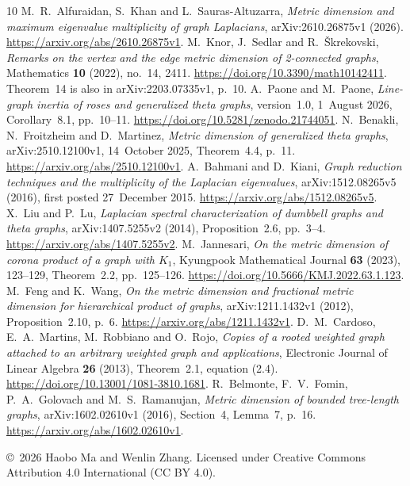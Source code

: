 \documentclass[11pt]{article}
\begin{document}
\begin{thebibliography}{10}
 M.~R.~Alfuraidan, S.~Khan and L.~Sauras-Altuzarra,
\emph{Metric dimension and maximum eigenvalue multiplicity of graph
Laplacians}, arXiv:2610.26875v1 (2026).
\url{https://arxiv.org/abs/2610.26875v1}.
 M.~Knor, J.~Sedlar and R.~\v{S}krekovski,
\emph{Remarks on the vertex and the edge metric dimension of 2-connected
graphs}, Mathematics \textbf{10} (2022), no.~14, 2411.
\url{https://doi.org/10.3390/math10142411}.
Theorem~14 is also in arXiv:2203.07335v1, p.~10.
 A.~Paone and M.~Paone,
\emph{Line-graph inertia of roses and generalized theta graphs},
version~1.0, 1~August 2026, Corollary~8.1, pp.~10--11.
\url{https://doi.org/10.5281/zenodo.21744051}.
 N.~Benakli, N.~Froitzheim and D.~Martinez,
\emph{Metric dimension of generalized theta graphs},
arXiv:2510.12100v1, 14~October 2025, Theorem~4.4, p.~11.
\url{https://arxiv.org/abs/2510.12100v1}.
 A.~Bahmani and D.~Kiani,
\emph{Graph reduction techniques and the multiplicity of the Laplacian
eigenvalues}, arXiv:1512.08265v5 (2016), first posted 27~December 2015.
\url{https://arxiv.org/abs/1512.08265v5}.
 X.~Liu and P.~Lu, \emph{Laplacian spectral characterization
of dumbbell graphs and theta graphs}, arXiv:1407.5255v2 (2014),
Proposition~2.6, pp.~3--4.
\url{https://arxiv.org/abs/1407.5255v2}.
 M.~Jannesari, \emph{On the metric dimension of corona
product of a graph with $K_1$}, Kyungpook Mathematical Journal
\textbf{63} (2023), 123--129, Theorem~2.2, pp.~125--126.
\url{https://doi.org/10.5666/KMJ.2022.63.1.123}.
 M.~Feng and K.~Wang, \emph{On the metric dimension and
fractional metric dimension for hierarchical product of graphs},
arXiv:1211.1432v1 (2012), Proposition~2.10, p.~6.
\url{https://arxiv.org/abs/1211.1432v1}.
 D.~M.~Cardoso, E.~A.~Martins, M.~Robbiano and O.~Rojo,
\emph{Copies of a rooted weighted graph attached to an arbitrary
weighted graph and applications}, Electronic Journal of Linear Algebra
\textbf{26} (2013), Theorem~2.1, equation (2.4).
\url{https://doi.org/10.13001/1081-3810.1681}.
 R.~Belmonte, F.~V.~Fomin, P.~A.~Golovach and
M.~S.~Ramanujan, \emph{Metric dimension of bounded tree-length graphs},
arXiv:1602.02610v1 (2016), Section~4, Lemma~7, p.~16.
\url{https://arxiv.org/abs/1602.02610v1}.
\end{thebibliography}
\noindent\small\copyright\ 2026 Haobo Ma and Wenlin Zhang.
Licensed under Creative Commons Attribution 4.0 International (CC BY 4.0).
\end{document}
